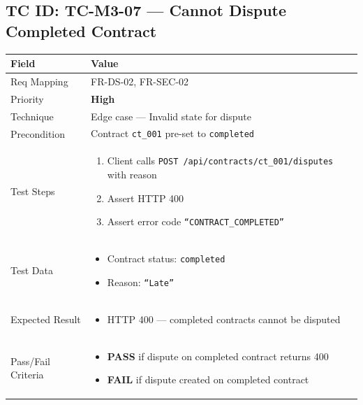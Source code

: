 \documentclass[12pt,a4paper]{article}
\newcommand{\sevhigh}{\textcolor{severityhigh}{\textbf{High}}}
\newcommand{\passresult}{\textcolor{passgreen}{\textbf{PASS}}}
\newcommand{\failresult}{\textcolor{failred}{\textbf{FAIL}}}
\begin{document}
\vspace{0.8cm}

\subsection{TC ID: TC-M3-07 --- Cannot Dispute Completed Contract}

\begin{tabular}{|p{}|p{}|}
\hline
\rowcolor{lightblue} \textbf{Field} & \textbf{Value} \\
\hline
Req Mapping & FR-DS-02, FR-SEC-02 \\
\hline
Priority & \sevhigh \\
\hline
Technique & Edge case --- Invalid state for dispute \\
\hline
Precondition & Contract \texttt{ct\_001} pre-set to \texttt{completed} \\
\hline
Test Steps &
\begin{enumerate}[nosep, leftmargin=*]
  \item Client calls \texttt{POST /api/contracts/ct\_001/disputes} with reason
  \item Assert HTTP 400
  \item Assert error code \texttt{``CONTRACT\_COMPLETED''}
\end{enumerate} \\
\hline
Test Data &
\begin{itemize}[nosep, leftmargin=*]
  \item Contract status: \texttt{completed}
  \item Reason: \texttt{``Late''}
\end{itemize} \\
\hline
Expected Result &
\begin{itemize}[nosep, leftmargin=*]
  \item HTTP 400 --- completed contracts cannot be disputed
\end{itemize} \\
\hline
Pass/Fail Criteria &
\begin{itemize}[nosep, leftmargin=*]
  \item \passresult{} if dispute on completed contract returns 400
  \item \failresult{} if dispute created on completed contract
\end{itemize} \\
\hline
\end{tabular}
\end{document}
